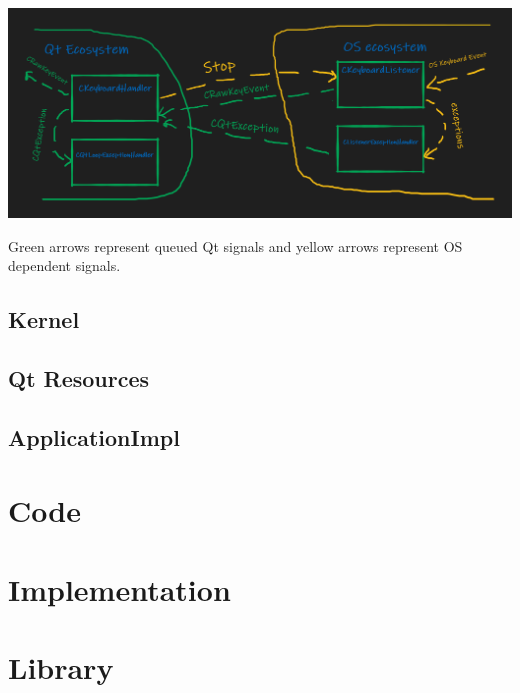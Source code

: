\documentclass{article}
\begin{document}
\begin{center}
\includegraphics[scale = 0.5]{Figures/KeyboardInterception.png}

Green arrows represent queued Qt signals and yellow arrows represent OS dependent signals.
\end{center}

\subsection{Kernel}

\subsection{Qt Resources}

\subsection{ApplicationImpl}


\section{Code}

\section{Implementation}

\section{Library}
\end{document}
